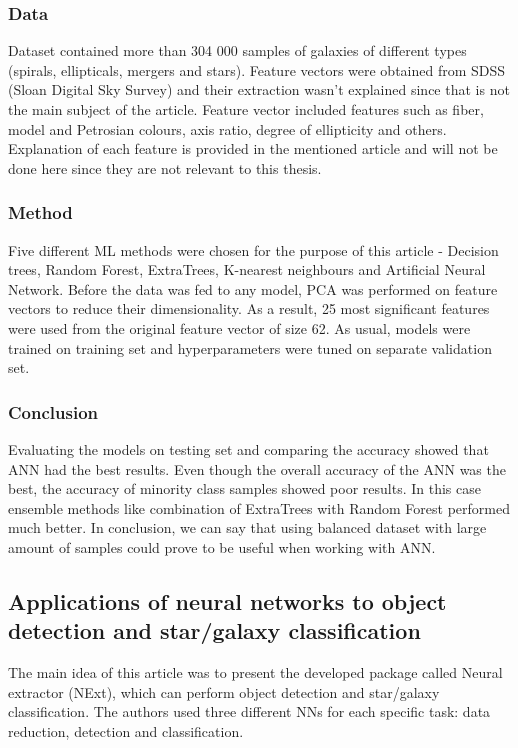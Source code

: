 \subsubsection{Data}
Dataset contained more than 304 000 samples of galaxies of different types (spirals, ellipticals, mergers and stars). Feature vectors were obtained from SDSS (Sloan Digital Sky Survey) and their extraction wasn't explained since that is not the main subject of the article. Feature vector included features such as fiber, model and Petrosian colours, axis ratio, degree of ellipticity and others. Explanation of each feature is provided in the mentioned article \cite{REZA2021100492} and will not be done here since they are not relevant to this thesis. 

\subsubsection{Method}
Five different ML methods were chosen for the purpose of this article - Decision trees, Random Forest, ExtraTrees, K-nearest neighbours and Artificial Neural Network. Before the data was fed to any model, PCA was performed on feature vectors to reduce their dimensionality. As a result, 25 most significant features were used from the original feature vector of size 62. As usual, models were trained on training set and hyperparameters were tuned on separate validation set. 

\subsubsection{Conclusion}
Evaluating the models on testing set and comparing the accuracy showed that ANN had the best results. Even though the overall accuracy of the ANN was the best, the accuracy of minority class samples showed poor results. In this case ensemble methods like combination of ExtraTrees with Random Forest performed much better. In conclusion, we can say that using balanced dataset with large amount of samples could prove to be useful when working with ANN. 


\subsection{Applications of neural networks to object detection and star/galaxy classification}
The main idea of this article \cite{Andreon2000} was to present the developed package called Neural extractor (NExt), which can perform object detection and star/galaxy classification. The authors used three different NNs for each specific task: data reduction, detection and classification. 

